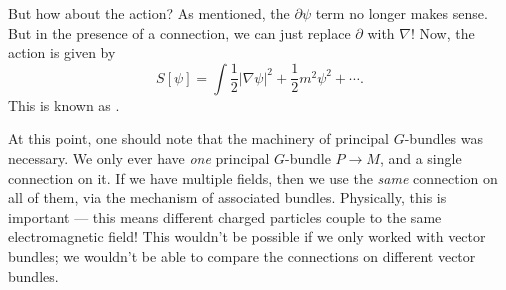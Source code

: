 \documentclass[a4paper]{article}
\begin{document}
But how about the action? As mentioned, the $\partial \psi$ term no longer makes sense. But in the presence of a connection, we can just replace $\partial$ with $\nabla$! Now, the action is given by
\[
  S[\psi] = \int \frac{1}{2} |\nabla \psi|^2 + \frac{1}{2} m^2 \psi^2 + \cdots.
\]
This is known as .

At this point, one should note that the machinery of principal $G$-bundles was necessary. We only ever have \emph{one} principal $G$-bundle $P \to M$, and a single connection on it. If we have multiple fields, then we use the \emph{same} connection on all of them, via the mechanism of associated bundles. Physically, this is important --- this means different charged particles couple to the same electromagnetic field! This wouldn't be possible if we only worked with vector bundles; we wouldn't be able to compare the connections on different vector bundles.
\end{document}
